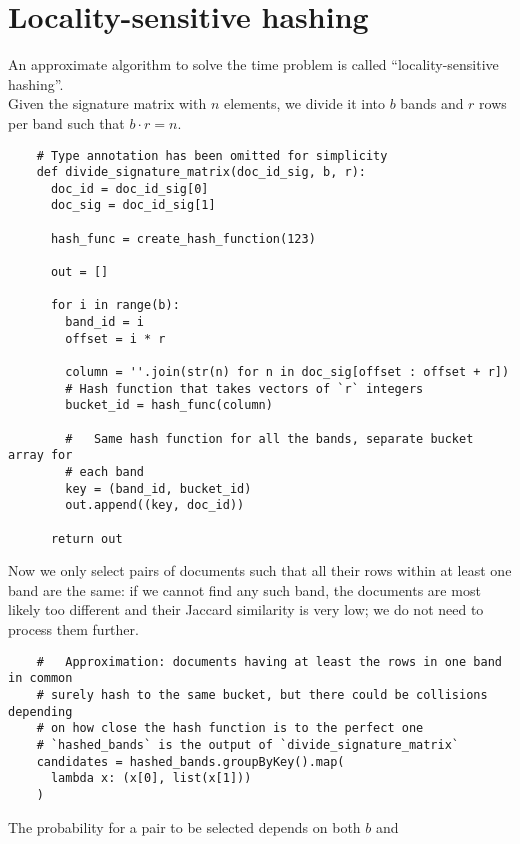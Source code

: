 \documentclass{article}
\begin{document}
  \section[LSH]{Locality-sensitive hashing}
  An approximate algorithm to solve the time problem is called
  “locality-sensitive hashing”. \\
  Given the signature matrix with \( n \) elements, we divide it into \( b \)
  bands and \( r \) rows per band such that \( b \cdot r = n \).
  \begin{verbatim}
    # Type annotation has been omitted for simplicity
    def divide_signature_matrix(doc_id_sig, b, r):
      doc_id = doc_id_sig[0]
      doc_sig = doc_id_sig[1]

      hash_func = create_hash_function(123)

      out = []

      for i in range(b):
        band_id = i
        offset = i * r

        column = ''.join(str(n) for n in doc_sig[offset : offset + r])
        # Hash function that takes vectors of `r` integers
        bucket_id = hash_func(column)

        #   Same hash function for all the bands, separate bucket array for
        # each band
        key = (band_id, bucket_id)
        out.append((key, doc_id))

      return out
  \end{verbatim}
  Now we only select pairs of documents such that all their rows within at
  least one band are the same: if we cannot find any such band, the documents
  are most likely too different and their Jaccard similarity is very low; we do
  not need to process them further. \\
  \begin{verbatim}
    #   Approximation: documents having at least the rows in one band in common
    # surely hash to the same bucket, but there could be collisions depending
    # on how close the hash function is to the perfect one
    # `hashed_bands` is the output of `divide_signature_matrix`
    candidates = hashed_bands.groupByKey().map(
      lambda x: (x[0], list(x[1]))
    )
  \end{verbatim}
  The probability for a pair to be selected depends on both \( b \) and
\end{document}
